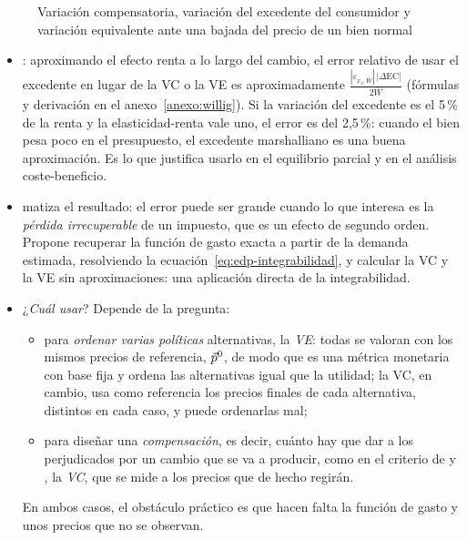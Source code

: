 \documentclass[11pt]{article}
\begin{document}
\begin{figure}[H]
\centering
\caption{Variación compensatoria, variación del excedente del consumidor y variación equivalente ante una bajada del precio de un bien normal}\label{fig:bienestar-vc-ve}
\end{figure}

\begin{itemize}
\item {}\nocite{Willig1976Surplus}: aproximando el efecto renta a lo largo del cambio, el error relativo de usar el excedente en lugar de la VC o la VE es aproximadamente $\frac{|\varepsilon_{x_1,\overline{W}}|\,|\Delta\mathrm{EC}|}{2\overline{W}}$ (fórmulas y derivación en el anexo~\ref{anexo:willig}). Si la variación del excedente es el 5\,\% de la renta y la elasticidad-renta vale uno, el error es del 2,5\,\%: cuando el bien pesa poco en el presupuesto, el excedente marshalliano es una buena aproximación. Es lo que justifica usarlo en el equilibrio parcial  y en el análisis coste-beneficio.
\item \textcite{Hausman1981Exact} matiza el resultado: el error puede ser grande cuando lo que interesa es la \emph{pérdida irrecuperable} de un impuesto, que es un efecto de segundo orden. Propone recuperar la función de gasto exacta a partir de la demanda estimada, resolviendo la ecuación~\eqref{eq:edp-integrabilidad}, y calcular la VC y la VE sin aproximaciones: una aplicación directa de la integrabilidad.
\item ¿\emph{Cuál usar}? Depende de la pregunta:
  \begin{itemize}
  \item para \emph{ordenar varias políticas} alternativas, la \emph{VE}: todas se valoran con los mismos precios de referencia, $\vec{p}^0$, de modo que es una métrica monetaria con base fija y ordena las alternativas igual que la utilidad; la VC, en cambio, usa como referencia los precios finales de cada alternativa, distintos en cada caso, y puede ordenarlas mal\nocite{MasColellWhinstonGreen1995};
  \item para diseñar una \emph{compensación}, es decir, cuánto hay que dar a los perjudicados por un cambio que se va a producir, como en el criterio de  y  , la \emph{VC}, que se mide a los precios que de hecho regirán.
  \end{itemize}
  En ambos casos, el obstáculo práctico es que hacen falta la función de gasto y unos precios que no se observan.
\end{itemize}
\end{document}
